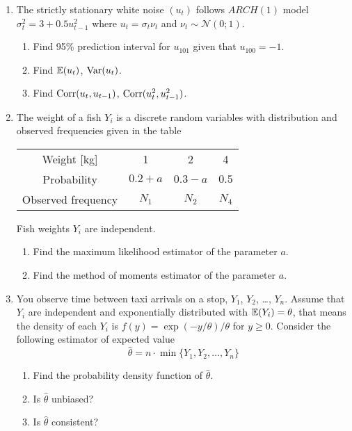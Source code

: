 \begin{enumerate}
    
    \item The strictly stationary white noise $(u_t)$ follows $ARCH(1)$ model $\sigma^2_t = 3 + 0.5 u_{t-1}^2$ where 
    $u_t = \sigma_t \nu_t$ and $\nu_t \sim \mathcal{N}(0;1)$.
    \begin{enumerate}
        \item Find 95\% prediction interval for $u_{101}$ given that $u_{100} = -1$.
        \item Find $\operatorname{\mathbb{E}}(u_t)$, $\operatorname{Var}(u_t)$.
        \item Find $\operatorname{Corr}(u_t, u_{t-1})$, $\operatorname{Corr}(u_t^2, u_{t-1}^2)$.
    \end{enumerate}
    
    \item The weight of a fish $Y_i$ is a discrete random variables with 
    distribution and observed frequencies given in the table 
    
    \begin{tabular}{cccc}
        \toprule
        Weight [kg] & 1 & 2 & 4 \\
        Probability & $0.2 + a$ & $0.3 - a$ & $0.5$ \\
        Observed frequency & $N_1$ & $N_2$ & $N_4$ \\
        \bottomrule
    \end{tabular}
    
    Fish weights $Y_i$ are independent. 
    
    \begin{enumerate}
        \item Find the maximum likelihood estimator of the parameter $a$. 
        \item Find the method of moments estimator of the parameter $a$. 
    \end{enumerate}
        
    \item You observe time between taxi arrivals on a stop, $Y_1$, $Y_2$, \ldots, $Y_n$.
    Assume that $Y_i$ are independent and exponentially distributed with $\operatorname{\mathbb{E}}(Y_i) = \theta$, 
    that means the density of each $Y_i$ is $f(y) = \exp(-y/\theta)/\theta$ for $y\geq 0$. 
    Consider the following estimator of expected value
    \[
    \hat \theta = n \cdot \min\{Y_1, Y_2, \dots, Y_n \}    
    \]
    \begin{enumerate}
        \item Find the probability density function of $\hat \theta$. 
        \item Is $\hat \theta$ unbiased?
        \item Is $\hat \theta$ consistent?
    \end{enumerate}
    
    
\end{enumerate}
    



